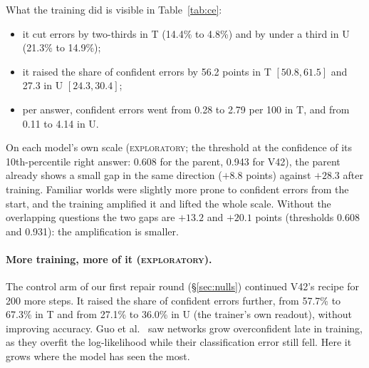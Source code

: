 \documentclass[11pt]{article}
\newcommand{\explo}{\textsc{exploratory}}
\begin{document}
What the training did is visible in Table~\ref{tab:ce}:
\begin{itemize}
  \item it cut errors by two-thirds in T (14.4\% to 4.8\%) and by under a third in U (21.3\% to 14.9\%);
  \item it raised the share of confident errors by 56.2 points in T $[50.8, 61.5]$ and 27.3 in U $[24.3, 30.4]$;
  \item per answer, confident errors went from 0.28 to 2.79 per 100 in T, and from 0.11 to 4.14 in U.
\end{itemize}
On each model's own scale (\explo; the threshold at the confidence of its 10th-percentile right answer: 0.608 for the
parent, 0.943 for V42), the parent already shows a small gap in the same direction ($+8.8$ points)
against $+28.3$ after training. Familiar worlds were slightly more prone to confident errors from the start, and the
training amplified it and lifted the whole scale. Without the overlapping questions the two gaps are $+13.2$ and $+20.1$
points (thresholds 0.608 and 0.931): the amplification is smaller.

\paragraph{More training, more of it (\explo).} The control arm of our first repair round (\S\ref{sec:nulls})
continued V42's recipe for 200 more steps. It raised the share of confident errors further, from 57.7\% to
67.3\% in T and from 27.1\% to 36.0\% in U (the trainer's own readout), without improving accuracy. Guo et al.\
\cite{guo2017} saw networks grow overconfident late in training, as they overfit the log-likelihood while their
classification error still fell. Here it grows where the model has seen the most.
\end{document}
